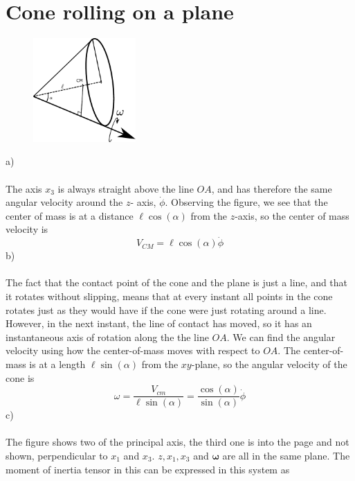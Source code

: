 \documentclass{article}
\begin{document}
    \section{Cone rolling on a plane}
        \begin{figure}
            \includegraphics[width=0.35\textwidth]{figures/exercise_7_3_cone2.pdf}
        \end{figure}
        a) \\ \\
        The axis $x_3$ is always straight above the line $OA$, and has therefore the same angular velocity around the $z$- axis, $\dot \phi$. Observing the figure, we see that the center of mass is at a distance $\ell \cos(\alpha)$ from the $z$-axis, so the center of mass velocity is
        \begin{equation*}
            V_{CM} = \ell \cos(\alpha) \dot \phi
        \end{equation*}
        b) \\ \\
        The fact that the contact point of the cone and the plane is just a line, and that it rotates without slipping, means that at every instant all points in the cone rotates just as they would have if the cone were just rotating around a line. However, in the next instant, the line of contact has moved, so it has an instantaneous axis of rotation along the the line $OA$. We can find the angular velocity using how the center-of-mass moves with respect to $OA$. The  center-of-mass is at a length $\ell \sin(\alpha)$ from the $xy$-plane, so the angular velocity of the cone is        
        \begin{equation*}
            \omega = \frac{V_{cm}}{\ell \sin(\alpha)} = \frac{\cos(\alpha)}{\sin(\alpha)} \dot \phi
        \end{equation*}
        c) \\ \\
        The figure shows two of the principal axis, the third one is into the page and not shown, perpendicular to $x_1$ and $x_3$. $z, x_1, x_3$ and $\boldsymbol{\omega}$ are all in the same plane. The moment of inertia tensor in this can be expressed in this system as 
\end{document}
